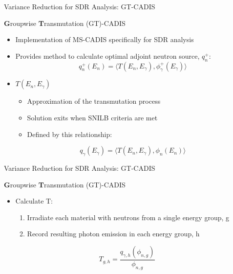 \documentclass{beamer}
\begin{document}
\begin{frame}{Variance Reduction for SDR Analysis: GT-CADIS}
\begin{block}{\textbf{G}roupwise \textbf{T}ransmutation (GT)-CADIS \cite{gtcadis}}
  \begin{itemize}
  \item{Implementation of MS-CADIS specifically for SDR analysis}
  \item{Provides method to calculate optimal adjoint neutron source, $q_n^+$:}
\begin{equation}
	q^{+}_n(E_n) = \langle T(E_n, E_{\gamma}) ,
	\phi_{\gamma}^{+}(E_{\gamma}) \rangle
\end{equation}
\item{$T(E_n, E_{\gamma})$ }%
		  \begin{itemize}
			  \item{Approximation of the transmutation
				  process}
			  \item{Solution exits when SNILB criteria
				  are met}
			  \item{Defined by this relationship:}
		  \end{itemize}
\begin{equation} \label{eq:Tdef}
	q_{\gamma}(E_{\gamma}) = 
	\langle T(E_{n}, E_{\gamma}),
	\phi_{n}(E_{n}) \rangle
\end{equation}

  \end{itemize}
\end{block}
%
%
\end{frame}

\begin{frame}{Variance Reduction for SDR Analysis: GT-CADIS}
\begin{block}{\textbf{G}roupwise \textbf{T}ransmutation (GT)-CADIS \cite{gtcadis}}
  \begin{itemize}
	  \item{Calculate T:}
	  \begin{enumerate}
		  \item{Irradiate each material with neutrons from a single
			  energy group, g}
		  \item{Record resulting photon emission in each energy group,
			  h}
	  \end{enumerate}
  \end{itemize}
	\begin{equation}
		T_{g,h} = \frac{q_{\gamma,h}(\phi_{n,g})}{\phi_{n,g}}
	\end{equation}
\end{block}
\end{frame}
\end{document}
